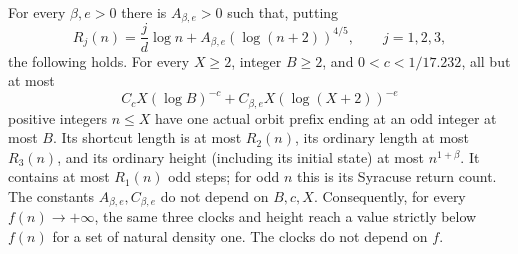 \begin{theorem}
\label{thm:Shaik-allikvere-drift-target}
For every \(\beta,e>0\) there is \(A_{\beta,e}>0\) such that,
putting
\[
 R_j(n)=\frac{j}{d}\log n+
             A_{\beta,e}(\log(n+2))^{4/5},\qquad j=1,2,3,
\]
the following holds. For every \(X\ge2\), integer \(B\ge2\), and
\(0<c<1/17.232\), all but at most
\begin{equation}\label{eq:Shaik-allikvere-count}
 C_c X(\log B)^{-c}
       +C_{\beta,e}X(\log(X+2))^{-e}
\end{equation}
positive integers \(n\le X\) have one actual orbit prefix ending at
an odd integer at most \(B\). Its shortcut length is at most \(R_2(n)\),
its ordinary length at most \(R_3(n)\), and its ordinary height
(including its initial state) at most \(n^{1+\beta}\).
It contains at most \(R_1(n)\) odd steps; for odd \(n\) this is
its Syracuse return count.
The constants \(A_{\beta,e},C_{\beta,e}\) do not depend on \(B,c,X\).
Consequently, for every \(f(n)\to+\infty\), the same three clocks
and height reach a value strictly below \(f(n)\) for a set of
natural density one. The clocks do not depend on \(f\).
\end{theorem}
